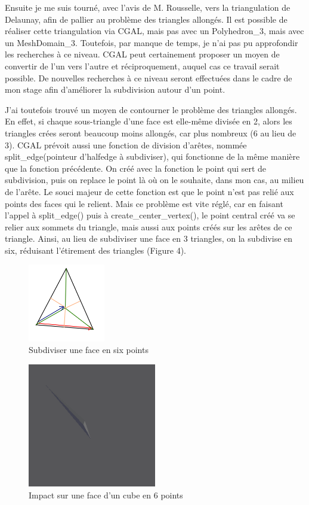 \documentclass[a4paper,french]{report}
\begin{document}
					Ensuite je me suis tourné, avec l'avis de M. Rousselle, vers la triangulation de Delaunay, afin de pallier au problème des triangles allongés. Il est possible de réaliser cette triangulation via CGAL, mais pas avec un Polyhedron\_3, mais avec un MeshDomain\_3. Toutefois, par manque de temps, je n'ai pas pu approfondir les recherches à ce niveau. CGAL peut certainement proposer un moyen de convertir de l'un vers l'autre et réciproquement, auquel cas ce travail serait possible. De nouvelles recherches à ce niveau seront effectuées dans le cadre de mon stage afin d'améliorer la subdivision autour d'un point. \par
					J'ai toutefois trouvé un moyen de contourner le problème des triangles allongés. En effet, si chaque sous-triangle d'une face est elle-même divisée en 2, alors les triangles crées seront beaucoup moins allongés, car plus nombreux (6 au lieu de 3). CGAL prévoit aussi une fonction de division d'arêtes, nommée split\_edge(pointeur d'halfedge à subdiviser), qui fonctionne de la même manière que la fonction précédente. On créé avec la fonction le point qui sert de subdivision, puis on replace le point là où on le souhaite, dans mon cas, au milieu de l'arête. Le souci majeur de cette fonction est que le point n'est pas relié aux points des faces qui le relient. Mais ce problème est vite réglé, car en faisant l'appel à split\_edge() puis à create\_center\_vertex(), le point central créé va se relier aux sommets du triangle, mais aussi aux points créés sur les arêtes de ce triangle. Ainsi, au lieu de subdiviser une face en 3 triangles, on la subdivise en six, réduisant l'étirement des triangles (Figure 4). 
					\begin{figure}[h]
						\centering
						\includegraphics[width=0.3\textwidth]{FigBarycentricMeshSplit.png}
						\caption{Subdiviser une face en six points}
					\end{figure}
					\begin{figure}[h]
						\centering
						\includegraphics[width=0.5\textwidth]{impact2.png}
						\caption{Impact sur une face d'un cube en 6 points}
					\end{figure}
\end{document}
